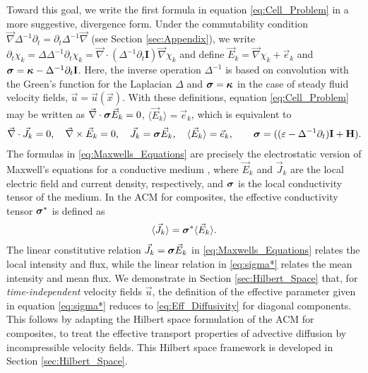 \documentclass[11pt]{amsart}
\newcommand{\Hb}{\mathbf{H}}
\newcommand{\Ib}{\mathbf{I}}
\newcommand\bsig{\mbox{\boldmath${\sigma}$}}
\newcommand\bkappa{\mbox{\boldmath${\kappa}$}}
\begin{document}
Toward this goal, we write the first formula in equation
\eqref{eq:Cell_Problem} in a more suggestive, divergence
form. Under the commutability condition
$\vec{\nabla}\Delta^{-1}\partial_t=\partial_t\Delta^{-1}\vec{\nabla}$ (see Section
\ref{sec:Appendix}), we write
\cite{Fannjiang:SIAM_JAM:333}  
$\partial_t\chi_k=\Delta\Delta^{-1}\partial_t\chi_k=\vec{\nabla}\cdot(\Delta^{-1}\partial_t\Ib)\vec{\nabla}\chi_k$ and define
$\vec{E}_k=\vec{\nabla}\chi_k+\vec{e}_k$ and $\bsig=\bkappa-\Delta^{-1}\partial_t\Ib
$. Here, the inverse operation $\Delta^{-1}$ is based on convolution with
the Green's function for the Laplacian $\Delta$ and $\bsig=\bkappa$ in the
case of steady fluid velocity fields, $\vec{u}=\vec{u}(\vec{x})$. 
With these definitions, equation \eqref{eq:Cell_Problem} may be
written as $\vec{\nabla}\cdot\bsig\vec{E}_k=0$, $\langle\vec{E}_k\rangle=\vec{e}_k$, which
is equivalent to  
%
\begin{align}\label{eq:Maxwells_Equations}    
  \vec{\nabla}\cdot\vec{J}_k=0, \quad
  \vec{\nabla}\times\vec{E}_k=0, \quad
  \vec{J}_k=\bsig\vec{E}_k,\quad
  \langle\vec{E}_k\rangle=\vec{e}_k,\qquad
  \bsig%
       =((\varepsilon-\Delta^{-1}\partial_t)\Ib+\Hb).
\end{align}
%
The formulas in
\eqref{eq:Maxwells_Equations} are  
precisely the electrostatic version of Maxwell's equations for a
conductive medium \cite{Golden:CMP-473}, where $\vec{E}_k$ and
$\vec{J}_k$ are the local electric field and current density,
respectively, and $\bsig$ is the local conductivity tensor of the
medium. In the ACM for composites, the effective conductivity tensor
$\bsig^*$ is defined as
% 
\begin{align}\label{eq:sigma*}
  \langle\vec{J}_k\rangle=\bsig^*\langle\vec{E}_k\rangle.
\end{align}
%
The linear constitutive relation $\vec{J}_k=\bsig\vec{E}_k$ in
\eqref{eq:Maxwells_Equations} relates the local intensity and flux,
while the linear relation in \eqref{eq:sigma*} relates the mean
intensity and mean flux. We demonstrate in Section
\ref{sec:Hilbert_Space} that, for 
\emph{time-independent} velocity fields $\vec{u}$, the definition of
the effective parameter given in equation \eqref{eq:sigma*} reduces to
\eqref{eq:Eff_Diffusivity} for diagonal components. This follows by
adapting the Hilbert space formulation of the ACM for composites, to
treat the effective transport properties of advective
diffusion by incompressible velocity fields. This Hilbert
space framework is developed in Section \ref{sec:Hilbert_Space}.      
\end{document}
